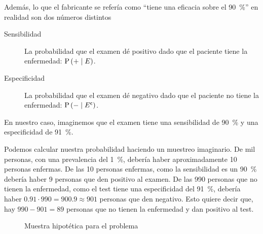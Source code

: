 Además, lo que el fabricante se refería como  \enquote{tiene una eficacia sobre el \qty{90}{\percent}} en realidad son dos números distintos
\begin{description}
    \item[Sensibilidad] La probabilidad que el examen dé positivo dado que el paciente tiene la enfermedad: \(\operatorname{P}\left(+\;\middle|\;E\right)\).
    \item[Especificidad] La probabilidad que el examen dé negativo dado que el paciente no tiene la enfermedad: \(\operatorname{P}\left(-\;\middle|\;{E}^{\mathsf{c}}\right)\).
\end{description}
En nuestro caso, imaginemos que el examen tiene una sensibilidad de \qty{90}{\percent} y una especificidad de \qty{91}{\percent}.

Podemos calcular nuestra probabilidad haciendo un muestreo imaginario. De mil personas, con una prevalencia del \qty{1}{\percent}, debería haber aproximadamente 10 personas enfermas. De las 10 personas enfermas, como la sensibilidad es un \qty{90}{\percent} debería haber 9 personas que den positivo al examen. De las 990 personas que no tienen la enfermedad, como el test tiene una especificidad del \qty{91}{\percent}, debería haber \(\num{0,91}\cdot990= \num{900,9}\approx\num{901}\) personas que den negativo. Esto quiere decir que, hay \(\num{990}-\num{901}=\num{89}\) personas que no tienen la enfermedad y dan positivo al test.

\begin{figure}[h!]
    \caption{Muestra hipotética para el problema}
\end{figure}

